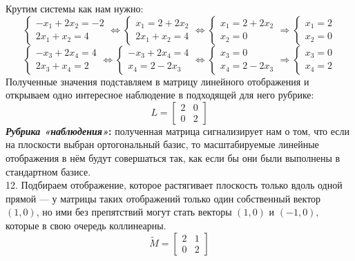 \documentclass[a3paper,14pt]{extarticle}
\begin{document}
Крутим системы как нам нужно:
$$\begin{cases}
    -x_1 + 2x_2 = -2 \\ 2x_1 + x_2 = 4
\end{cases} \Leftrightarrow \begin{cases}
    x_1 = 2 + 2x_2 \\ 2x_1 + x_2 = 4
\end{cases} \Leftrightarrow \begin{cases}
    x_1 = 2 + 2x_2 \\ x_2 = 0
\end{cases} \Rightarrow \begin{cases}
    x_1 = 2 \\ x_2 = 0
\end{cases}$$
$$\begin{cases}
    -x_3 + 2x_4 = 4 \\ 2x_3 + x_4 = 2
\end{cases} \Leftrightarrow \begin{cases}
    -x_3 + 2x_4 = 4 \\ x_4 = 2 - 2x_3
\end{cases} \Leftrightarrow \begin{cases}
    x_3 = 0 \\ x_4 = 2 - 2x_3
\end{cases} \Rightarrow \begin{cases}
    x_3 = 0 \\ x_4 = 2
\end{cases}
$$
Полученные значения подставляем в матрицу линейного отображения и открываем одно интересное наблюдение в подходящей для него рубрике:
$$L = \begin{bmatrix}
    2 & 0 \\ 0 & 2
\end{bmatrix}$$
\textbf{\textit{Рубрика «наблюдения»}:} полученная матрица сигнализирует нам о том, что если на плоскости выбран ортогональный базис, то масштабируемые линейные отображения в нём будут совершаться так, как если бы они были выполнены в стандартном базисе.\\[1.5em]
12. Подбираем отображение, которое растягивает плоскость только вдоль одной прямой --- у матрицы таких отображений только один собственный вектор $(1, 0)$, но ими без препятствий могут стать векторы $(1, 0)$ и $(-1, 0)$, которые в свою очередь коллинеарны.
$$\tilde{M} = \begin{bmatrix}
    2 & 1 \\ 0 & 2
\end{bmatrix}$$\,\\[0.5em]
\end{document}
